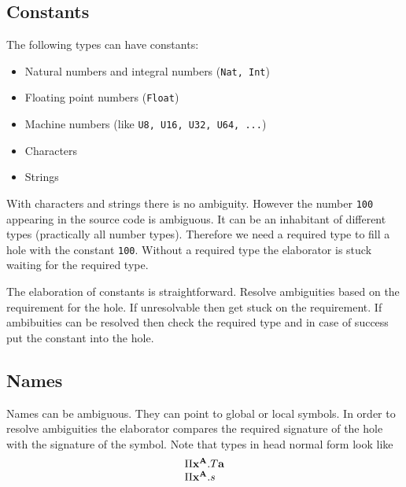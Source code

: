 \subsection{Constants}

The following types can have constants:
\begin{itemize}
    \item Natural numbers and integral numbers ({\tt Nat, Int})
    \item Floating point numbers ({\tt Float})
    \item Machine numbers (like {\tt U8, U16, U32, U64, ...})
    \item Characters
    \item Strings
\end{itemize}

With characters and strings there is no ambiguity. However the number {\tt 100}
appearing in the source code is ambiguous. It can be an inhabitant of different
types (practically all number types). Therefore we need a required type to fill
a hole with the constant {\tt 100}. Without a required type the elaborator is
stuck waiting for the required type.

The elaboration of constants is straightforward. Resolve ambiguities based on
the requirement for the hole. If unresolvable then get stuck on the requirement.
If ambibuities can be resolved then check the required type and in case of
success put the constant into the hole.








\subsection{Names}

Names can be ambiguous. They can point to global or local symbols. In
order to resolve ambiguities the elaborator compares the required signature of
the hole with the signature of the symbol. Note that types in head normal form
look like
$$
\begin{array}{l}
    \Pi {{\mathbf x}^{{\mathbf A}}}. T {\mathbf a}
    \\
    \Pi {{\mathbf x}^{{\mathbf A}}}. s
\end{array}
$$

